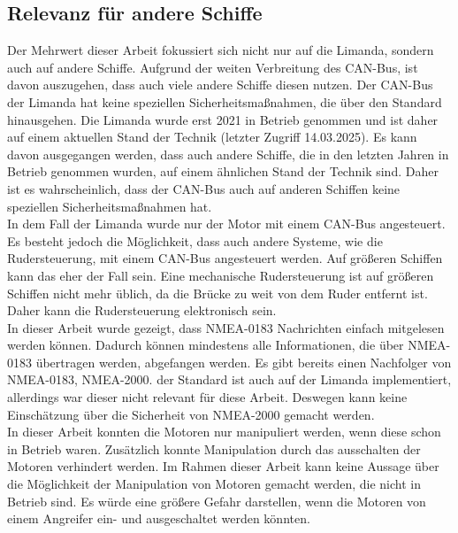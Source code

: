 \subsection{Relevanz für andere Schiffe}
Der Mehrwert dieser Arbeit fokussiert sich nicht nur auf die Limanda, sondern auch auf andere Schiffe.
Aufgrund der weiten Verbreitung des CAN-Bus, ist davon auszugehen, dass auch viele andere Schiffe diesen nutzen.
Der CAN-Bus der Limanda hat keine speziellen Sicherheitsmaßnahmen, die über den Standard hinausgehen. 
Die Limanda wurde erst 2021 in Betrieb genommen und ist daher auf einem aktuellen Stand der Technik \cite{limanda} (letzter Zugriff 14.03.2025).
Es kann davon ausgegangen werden, dass auch andere Schiffe, die in den letzten Jahren in Betrieb genommen wurden, auf einem
ähnlichen Stand der Technik sind. Daher ist es wahrscheinlich, dass der CAN-Bus auch auf anderen Schiffen keine speziellen
Sicherheitsmaßnahmen hat. \\
In dem Fall der Limanda wurde nur der Motor mit einem CAN-Bus angesteuert. Es besteht jedoch die Möglichkeit, dass auch 
andere Systeme, wie die Rudersteuerung, mit einem CAN-Bus angesteuert werden. Auf größeren Schiffen kann das eher der Fall sein. 
Eine mechanische Rudersteuerung ist auf größeren Schiffen nicht mehr üblich, da die Brücke zu weit von dem Ruder entfernt ist.
Daher kann die Rudersteuerung elektronisch sein. \\
In dieser Arbeit wurde gezeigt, dass NMEA-0183 Nachrichten einfach mitgelesen werden können. Dadurch können mindestens 
alle Informationen, die über NMEA-0183 übertragen werden, abgefangen werden. Es gibt bereits einen Nachfolger von NMEA-0183,
NMEA-2000. der Standard ist auch auf der Limanda implementiert, allerdings war dieser nicht relevant für diese Arbeit.
Deswegen kann keine Einschätzung über die Sicherheit von NMEA-2000 gemacht werden. \\
In dieser Arbeit konnten die Motoren nur manipuliert werden, wenn diese schon in Betrieb waren. Zusätzlich konnte
Manipulation durch das ausschalten der Motoren verhindert werden. Im Rahmen dieser Arbeit kann keine Aussage über 
die Möglichkeit der Manipulation von Motoren gemacht werden, die nicht in Betrieb sind. Es würde eine größere Gefahr
darstellen, wenn die Motoren von einem Angreifer ein- und ausgeschaltet werden könnten. \\


